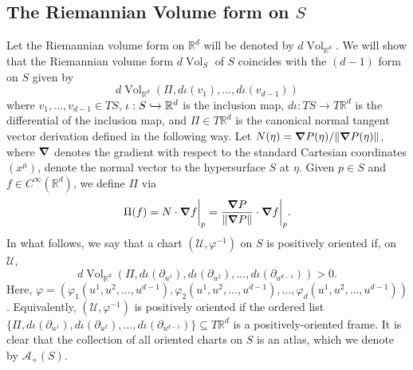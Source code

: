 \documentclass{article}
\newcommand{\R}{\mathbb{R}}
\newcommand{\f}[2]{\frac{#1}{#2}}
\theoremstyle{theorem}
\newcommand{\Vol}{\operatorname{Vol}}
\begin{document}
\subsection{The Riemannian Volume form on $S$}
Let the Riemannian volume form on $\mathbb{R}^d$ will be denoted by $d\Vol_{\mathbb{R}^d}$. We will show that the Riemannian volume form $d\Vol_S$ of $S$ coincides with the $(d-1)$ form on $S$ given by
\begin{equation*}
    d\Vol_{\R^d}(\Pi, d\iota(v_1),\dots, d\iota(v_{d-1}))
\end{equation*}
where $v_1,\dots,v_{d-1}\in TS$, $\iota: S\xhookrightarrow{} \R^d$ is the inclusion map,  $d\iota : TS \to T\R^d$ is the differential of the inclusion map,  and $\Pi\in T\mathbb{R}^d$ is the canonical normal tangent vector derivation defined in the following way. Let $N(\eta) = \grad P(\eta) /\norm{\grad P(\eta)}$, where $\grad$ denotes the gradient with respect to the standard Cartesian coordinates $(x^\mu)$, denote the normal vector to the hypersurface $S$ at $\eta$. Given $p\in S$ and $f\in C^{\infty}(\mathbb{R}^d)$, we define $\Pi$ via
\begin{equation*}
\Pi(f) = N \cdot \grad f \bigg\vert_{p} = \f{\grad P}{\norm{\grad P}}  \cdot \grad f \bigg\vert_{p}.
\end{equation*} 
In what follows, we say that a chart $(\mathcal{U},\varphi^{-1})$ on $S$ is positively oriented if, on $\mathcal{U}$,
\begin{equation*}
d\Vol_{\mathbb{R}^d}(\Pi,d\iota(\partial_{u^1}),d\iota(\partial_{u^2}),\dots,d\iota(\partial_{u^{d-1}}))>0.
\end{equation*}
Here, $\varphi = (\varphi_1(u^1,u^2,\dots, u^{d-1}), \varphi_2(u^1,u^2,\dots, u^{d-1}), \dots, \varphi_d(u^1,u^2,\dots, u^{d-1}))$. Equivalently, $(\mathcal{U},\varphi^{-1})$ is positively oriented if the ordered list $\{\Pi,d\iota(\partial_{u^1}),d\iota(\partial_{u^2}),\dots,d\iota(\partial_{u^{d-1}})\}\subseteq T\mathbb{R}^d$ is a positively-oriented frame. It is clear that the collection of all oriented charts on $S$ is an atlas, which we denote by $\mathcal{A}_+(S)$.\\
\end{document}

